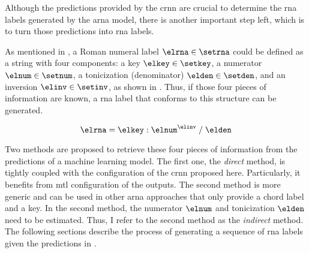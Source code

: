 
Although the predictions provided by the \gls{crnn} are
crucial to determine the \gls{rna} labels generated by the
\gls{arna} model, there is another important step left,
which is to turn those predictions into \gls{rna} labels.

As mentioned in
, a Roman
numeral label $\elrna \in \setrna$ could be defined as a
string with four components: a key $\elkey \in \setkey$, a
numerator $\elnum \in \setnum$, a tonicization (denominator)
$\elden \in \setden$, and an inversion $\elinv \in \setinv$,
as shown in . Thus, if those four pieces of
information are known, a \gls{rna} label that conforms to
this structure can be generated.

\begin{equation}
    \label{eq:rna}
    \elrna = \elkey : \elnum^{\elinv} \; / \; \elden
\end{equation}

Two methods are proposed to retrieve these four pieces of
information from the predictions of a machine learning
model. The first one, the \emph{direct} method, is tightly
coupled with the configuration of the \gls{crnn} proposed
here. Particularly, it benefits from  \gls{mtl}
configuration of the outputs. The second method is more
generic and can be used in other \gls{arna} approaches that
only provide a chord label and a key. In the second method,
the numerator $\elnum$ and tonicization $\elden$ need to be
estimated. Thus, I refer to the second method as the
\emph{indirect} method. The following sections describe the
process of generating a sequence of \gls{rna} labels given
the predictions in .





